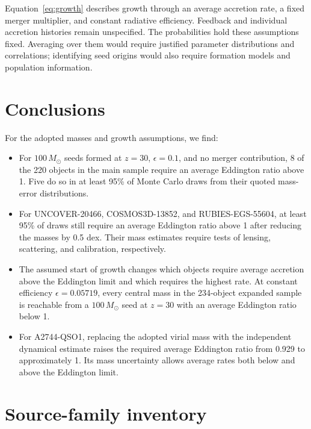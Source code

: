 \documentclass[11pt]{article}
\begin{document}
Equation~\ref{eq:growth} describes growth through an average accretion rate,
a fixed merger multiplier, and constant radiative efficiency. Feedback and
individual accretion histories remain unspecified. The probabilities hold
these assumptions fixed. Averaging over them would require justified
parameter distributions and correlations; identifying seed origins would
also require formation models and population information.

\section{Conclusions}

For the adopted masses and growth assumptions, we find:
\begin{itemize}
\item For $100\,M_\odot$ seeds formed at $z=30$, $\epsilon=0.1$, and no
merger contribution, 8 of the 220 objects in the main sample require an
average Eddington ratio above 1. Five do so in at least 95\% of Monte Carlo
draws from their quoted mass-error distributions.
\item For UNCOVER-20466, COSMOS3D-13852, and RUBIES-EGS-55604, at least
95\% of draws still require an average Eddington ratio above 1 after
reducing the masses by 0.5 dex. Their mass estimates require tests of lensing,
scattering, and calibration, respectively.
\item The assumed start of growth changes which objects require average
accretion above the Eddington limit and which requires the highest rate.
At constant efficiency $\epsilon=0.05719$, every central mass in the
234-object expanded sample is reachable from a $100\,M_\odot$ seed at $z=30$
with an average Eddington ratio below 1.
\item For A2744-QSO1, replacing the adopted virial mass with the independent
dynamical estimate raises the required average Eddington ratio from 0.929 to
approximately 1. Its mass uncertainty allows average rates both below and
above the Eddington limit.
\end{itemize}

\clearpage
\appendix
\makeatletter
\def\sectionprefix{Appendix~}
\renewcommand{\@seccntformat}[1]{\ifcsname #1prefix\endcsname\csname #1prefix\endcsname\fi\csname the#1\endcsname\quad}
\makeatother
\section{Source-family inventory}
\label{app:sources}
\end{document}
